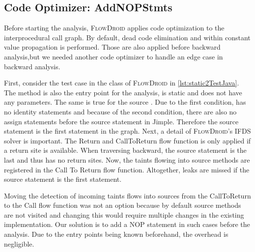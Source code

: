 \documentclass[../draft.tex]{subfiles}
\begin{document}
    \subsection{Code Optimizer: AddNOPStmts}
    Before starting the analysis, \textsc{FlowDroid} applies code optimization to the interprocedural call graph.
    By default, dead code elimination and within constant value propagation is performed.
    Those are also applied before backward analysis,but we needed another code optimizer to handle an edge case in backward analysis.

    First, consider the  test case in the  class of \textsc{FlowDroid} in \autoref{lst:static2TestJava}.
    The method is also the entry point for the analysis, is static and does not have any parameters.
    The same is true for the source .
    Due to the first condition,  has no identity statements and because of the second condition, there are also no assign statements before the source statement in Jimple.
    Therefore the source statement is the first statement in the graph.
    Next, a detail of \textsc{FlowDroid}'s IFDS solver is important.
    The Return and CallToReturn flow function is only applied if a return site is available.
    When traversing backward, the source statement is the last and thus has no return sites.
    Now, the taints flowing into source methods are registered in the Call To Return flow function.
    Altogether, leaks are missed if the source statement is the first statement.

    Moving the detection of incoming taints flows into sources from the CallToReturn to the Call flow function was not an option because by default source methods are not visited and changing this would require multiple changes in the existing implementation.
    Our solution is to add a NOP statement in such cases before the analysis.
    Due to the entry points being known beforehand, the overhead is negligible.
\end{document}
